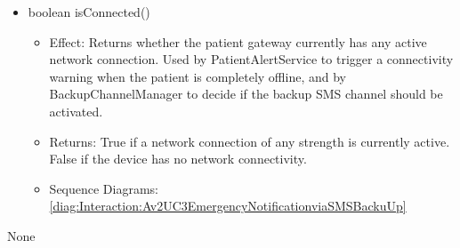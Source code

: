 \begin{description}
\begin{itemize}[noitemsep,nolistsep,leftmargin=-.25cm]
\begin{itemize}[noitemsep,nolistsep]
           \item Returns: A \ref{data:DatatypesNetworkType} enum value: NONE if no connection, CELLULAR if connected via mobile network, WIFI if connected via WiFi.
           \item Sequence Diagrams: None
        \end{itemize}
      \item \textsf{boolean isConnected()}
        \begin{itemize}[noitemsep,nolistsep]
           \item Effect: Returns whether the patient gateway currently has any active network connection. Used by PatientAlertService to trigger a connectivity warning when the patient is completely offline, and by BackupChannelManager to decide if the backup SMS channel should be activated. 
           \item Returns: True if a network connection of any strength is currently active. False if the device has no network connectivity.
           \item Sequence Diagrams: \cref{diag:Interaction:Av2UC3EmergencyNotificationviaSMSBackuUp}
        \end{itemize}
    \end{itemize}
      \item[Diagrams:] None
    \end{description}

